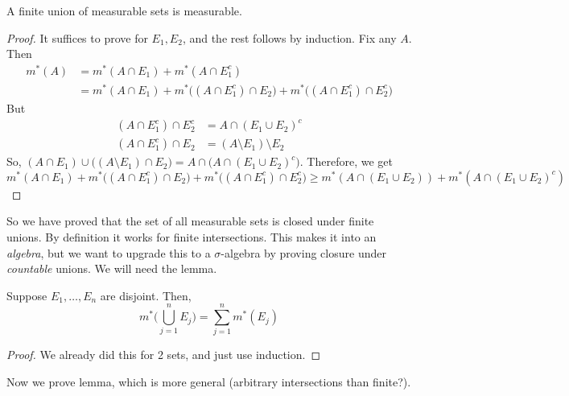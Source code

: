   \begin{theorem}
    A finite union of measurable sets is measurable. 
  \end{theorem}
  \begin{proof}
    It suffices to prove for $E_1, E_2$, and the rest follows by induction. Fix any $A$. Then 
    \begin{align}
      m^\ast (A) & = m^\ast (A \cap E_1) + m^\ast (A \cap E_1^c) \\ 
                   & = m^\ast (A \cap E_1) + m^\ast \big((A \cap E_1^c) \cap E_2 \big) + m^\ast \big((A \cap E_1^c) \cap E_2^c \big)
    \end{align}
    But 
    \begin{align}
      (A \cap E_1^c) \cap E_2^c & = A \cap (E_1 \cup E_2)^c \\ 
      (A \cap E_1^c) \cap E_2 & = (A \setminus E_1) \setminus E_2 
    \end{align}
    So, $(A \cap E_1) \cup \big( (A \setminus E_1) \cap E_2 \big) = A \cap \big(A \cap (E_1 \cup E_2)^c \big)$. Therefore, we get 
    \begin{equation}
      m^\ast (A \cap E_1) + m^\ast \big((A \cap E_1^c) \cap E_2 \big) + m^\ast \big((A \cap E_1^c) \cap E_2^c \big) \geq m^\ast (A \cap (E_1 \cup E_2)) + m^\ast ( A \cap (E_1 \cup E_2)^c ) 
    \end{equation}
  \end{proof} 

  So we have proved that the set of all measurable sets is closed under finite unions. By definition it works for finite intersections. This makes it into an \textit{algebra}, but we want to upgrade this to a $\sigma$-algebra by proving closure under \textit{countable} unions. We will need the lemma. 

  \begin{lemma} 
    Suppose $E_1, \ldots, E_n$ are disjoint. Then, 
    \begin{equation}
      m^\ast \bigg( \bigcup_{j=1}^n E_j \bigg) = \sum_{j=1}^n m^\ast (E_j)
    \end{equation}
  \end{lemma}
  \begin{proof}
    We already did this for 2 sets, and just use induction. 
  \end{proof} 

  Now we prove lemma, which is more general (arbitrary intersections than finite?). 

